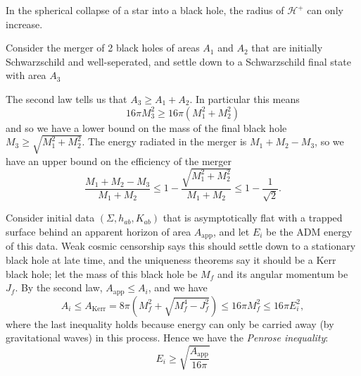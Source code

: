 \documentclass{jknotes}
\begin{document}
\begin{eg}
    In the spherical collapse of a star into a black hole, the radius of \(\mathcal{H}^+\) can only increase.
\end{eg}
\begin{eg}
    Consider the merger of 2 black holes of areas \(A_1\) and \(A_2\) that are initially Schwarzschild and well-seperated, and settle down to a Schwarzschild final state with area \(A_3\)

    The second law tells us that \(A_3 \ge A_1 + A_2\). In particular this means
    \begin{equation}
        16\pi M_3^2 \ge 16\pi(M_1^2 + M_2^2)
    \end{equation}
    and so we have a lower bound on the mass of the final black hole \(M_3 \ge \sqrt{M_1^2 + M_2^2}\). The energy radiated in the merger is \(M_1 + M_2 - M_3\), so we have an upper bound on the efficiency of the merger
    \begin{equation}
        \frac{M_1+M_2-M_3}{M_1+M_2} \le 1 - \frac{\sqrt{M_1^2+M_2^2}}{M_1+M_2} \le 1 - \frac{1}{\sqrt{2}}.
    \end{equation}
\end{eg}

Consider initial data \((\Sigma,h_{ab},K_{ab})\) that is asymptotically flat with a trapped surface behind an apparent horizon of area \(A_{\text{app}}\), and let \(E_i\) be the ADM energy of this data. Weak cosmic censorship says this should settle down to a stationary black hole at late time, and the uniqueness theorems say it should be a Kerr black hole; let the mass of this black hole be \(M_f\) and its angular momentum be \(J_f\). By the second law, \(A_{\text{app}} \le A_i\), and we have 
\begin{equation}
    A_i\le A_{\text{Kerr}} = 8\pi \left(M_f^2 + \sqrt{M_f^4-J_f^2}\right) \le 16\pi M_f^2 \le 16\pi E_i^2,
\end{equation}
where the last inequality holds because energy can only be carried away (by gravitational waves) in this process. Hence we have the \emph{Penrose inequality}:
\begin{equation}
    E_i \ge \sqrt{\frac{A_{\text{app}}}{16\pi}}
\end{equation}
\end{document}
